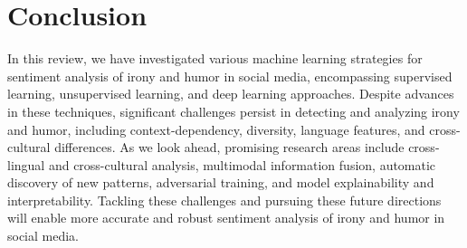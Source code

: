 \documentclass[a4paper]{article}
\begin{document}
\section{Conclusion}
In this review, we have investigated various machine learning strategies for sentiment analysis of irony and humor in social media, encompassing supervised learning, unsupervised learning, and deep learning approaches. Despite advances in these techniques, significant challenges persist in detecting and analyzing irony and humor, including context-dependency, diversity, language features, and cross-cultural differences. As we look ahead, promising research areas include cross-lingual and cross-cultural analysis, multimodal information fusion, automatic discovery of new patterns, adversarial training, and model explainability and interpretability. Tackling these challenges and pursuing these future directions will enable more accurate and robust sentiment analysis of irony and humor in social media.
\end{document}
